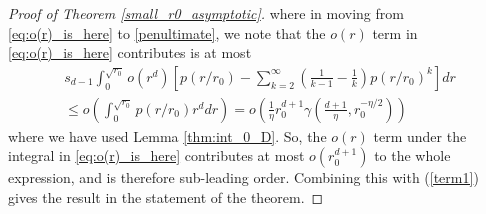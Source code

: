 \documentclass{article}
\begin{document}
\begin{proof}[Proof of Theorem \ref{small_r0_asymptotic}]
        where in moving from \eqref{eq:o(r)_is_here} to \eqref{penultimate}, we note that the $o(r)$ term in \eqref{eq:o(r)_is_here} contributes is at most 
        \begin{gather*}
            s_{d-1}\int_0^{\sqrt{r_0}} o(r^d) \left[p(r/r_0) - \sum_{k=2}^\infty \left(\frac{1}{k-1}-\frac{1}{k}\right)p(r/r_0)^k\right]dr \nonumber \\ \leq o\left(\int_0^{\sqrt{r_0}} p(r/r_0)r^d dr \right) = o\left(\frac{1}{\eta}r_0^{d+1} \gamma \left(\frac{d+1}{\eta},r_0^{-\eta/2}\right)\right)
        \end{gather*}
        where we have used Lemma \ref{thm:int_0_D}. So, the $o(r)$ term under the integral in \eqref{eq:o(r)_is_here} contributes at most $o(r_0^{d+1})$ to the whole expression, and is therefore sub-leading order. Combining this with (\ref{term1}) gives the result in the statement of the theorem. 
    \end{proof}
\end{document}
